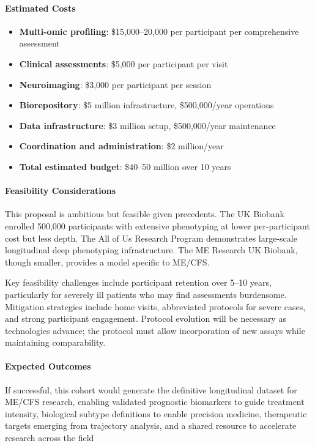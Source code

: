 \paragraph{Estimated Costs}
\begin{itemize}
    \item \textbf{Multi-omic profiling}: \$15,000--20,000 per participant per comprehensive assessment
    \item \textbf{Clinical assessments}: \$5,000 per participant per visit
    \item \textbf{Neuroimaging}: \$3,000 per participant per session
    \item \textbf{Biorepository}: \$5 million infrastructure, \$500,000/year operations
    \item \textbf{Data infrastructure}: \$3 million setup, \$500,000/year maintenance
    \item \textbf{Coordination and administration}: \$2 million/year
    \item \textbf{Total estimated budget}: \$40--50 million over 10 years
\end{itemize}

\paragraph{Feasibility Considerations}
This proposal is ambitious but feasible given precedents. The UK Biobank enrolled 500,000 participants with extensive phenotyping at lower per-participant cost but less depth. The All of Us Research Program demonstrates large-scale longitudinal deep phenotyping infrastructure. The ME Research UK Biobank, though smaller, provides a model specific to ME/CFS.

Key feasibility challenges include participant retention over 5--10 years, particularly for severely ill patients who may find assessments burdensome. Mitigation strategies include home visits, abbreviated protocols for severe cases, and strong participant engagement. Protocol evolution will be necessary as technologies advance; the protocol must allow incorporation of new assays while maintaining comparability.

\paragraph{Expected Outcomes}
If successful, this cohort would generate the definitive longitudinal dataset for ME/CFS research, enabling validated prognostic biomarkers to guide treatment intensity, biological subtype definitions to enable precision medicine, therapeutic targets emerging from trajectory analysis, and a shared resource to accelerate research across the field

